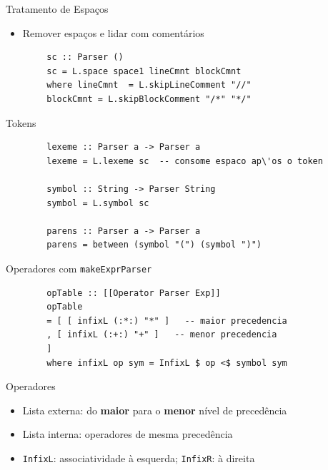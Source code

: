 \begin{frame}[fragile]{Tratamento de Espaços}

    \begin{itemize}

        \item
        Remover espaços e lidar com comentários
    \end{itemize}

    \begin{lstlisting}
        sc :: Parser ()
        sc = L.space space1 lineCmnt blockCmnt
        where lineCmnt  = L.skipLineComment "//"
        blockCmnt = L.skipBlockComment "/*" "*/"
    \end{lstlisting}
\end{frame}

\begin{frame}[fragile]{Tokens}

    \begin{lstlisting}
        lexeme :: Parser a -> Parser a
        lexeme = L.lexeme sc  -- consome espaco ap\'os o token

        symbol :: String -> Parser String
        symbol = L.symbol sc

        parens :: Parser a -> Parser a
        parens = between (symbol "(") (symbol ")")
    \end{lstlisting}
\end{frame}

\begin{frame}[fragile]{Operadores com
    \texttt{makeExprParser}}

    \begin{lstlisting}
        opTable :: [[Operator Parser Exp]]
        opTable
        = [ [ infixL (:*:) "*" ]   -- maior precedencia
        , [ infixL (:+:) "+" ]   -- menor precedencia
        ]
        where infixL op sym = InfixL $ op <$ symbol sym
    \end{lstlisting}
\end{frame}

\begin{frame}[fragile]{Operadores}

    \begin{itemize}

        \item
        Lista externa: do \textbf{maior} para o \textbf{menor} nível de
        precedência
        \item
        Lista interna: operadores de mesma precedência
        \item
        \texttt{InfixL}: associatividade à esquerda;
        \texttt{InfixR}: à direita
    \end{itemize}
\end{frame}

